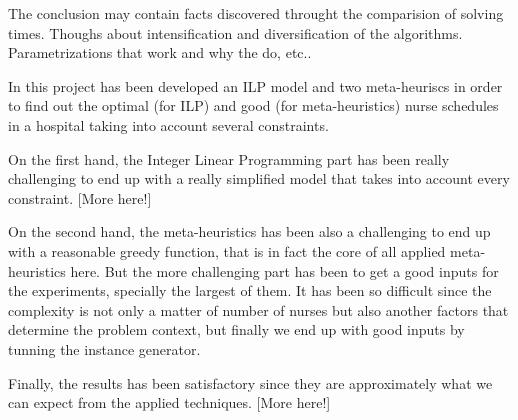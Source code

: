 The conclusion may contain facts discovered throught the comparision of solving times. Thoughs about intensification and diversification of the algorithms. Parametrizations that work and why the do, etc..

In this project has been developed an ILP model and two meta-heuriscs in order to find out the optimal (for ILP) and good (for meta-heuristics) nurse schedules in a hospital taking into account several constraints.

On the first hand, the Integer Linear Programming part has been really challenging to end up with a really simplified model that takes into account every constraint. [More here!]

On the second hand, the meta-heuristics has been also a challenging to end up with a reasonable greedy function, that is in fact the core of all applied meta-heuristics here. But the more challenging part has been to get a good inputs for the experiments, specially the largest of them. It has been so difficult since the complexity is not only a matter of number of nurses but also another factors that determine the problem context, but finally we end up with good inputs by tunning the instance generator.

Finally, the results has been satisfactory since they are approximately what we can expect from the applied techniques. [More here!]

\pagebreak